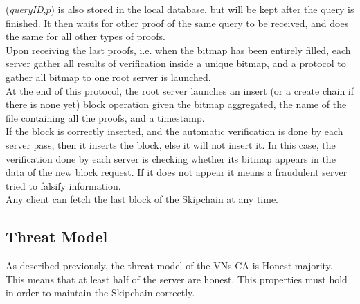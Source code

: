 \documentclass{article}
\begin{document}
(\textit{queryID},$p$) is also stored in the local database, but will be kept after the query is finished.
It then waits for other proof of the same query to be received, and does the same for all other types of proofs.\\
Upon receiving the last proofs, i.e. when the bitmap has been entirely filled, each server gather all results of verification inside a unique bitmap, and a protocol to gather all bitmap to one root server is launched.\\
At the end of this protocol, the root server launches an insert (or a create chain if there is none yet) block operation given the bitmap aggregated, the name of the file containing all the proofs, and a timestamp.\\
If the block is correctly inserted, and the automatic verification is done by each server pass, then it inserts the block, else it will not insert it. In this case, the verification done by each server is checking whether its bitmap appears in the data of the new block request. If it does not appear it means a fraudulent server tried to falsify information.\\
Any client can fetch the last block of the Skipchain at any time.

\subsection{Threat Model}
As described previously, the threat model of the VNs CA is Honest-majority. This means that at least half of the server are honest. This properties must hold in order to maintain the Skipchain correctly.
\end{document}

